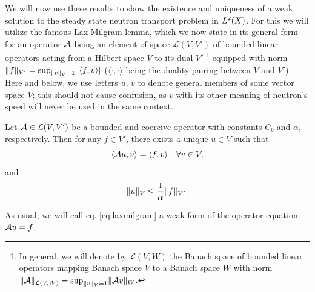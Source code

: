 {We will now use these results to show the existence and uniqueness of a weak solution to the steady state neutron
transport problem in $\Lp[2](X)$. For this we will utilize the famous Lax-Milgram lemma, which we now state in its
general form for an operator $\genop{A}$ being an element of space $\mathcal{L}(V,V')$ of bounded linear operators acting from 
a Hilbert space $V$ to its dual $V'$ \footnote{In general, we will denote by
$\mathcal{L}(V,W)$
 the Banach space of bounded linear operators mapping Banach space $V$ to a Banach space $W$ 
with norm $\norm[\mathcal{L}(V,W)]{\genop{A}} = \sup_{\norm[V]{v}=1} \norm[W]{\genop{A}v}$.} equipped with norm
$\norm[V']{f} = \sup_{\norm[V]{v} = 1} \abs{\langle f,v \rangle}$ ($\langle \cdot,\cdot\rangle$ being the duality 
pairing between $V$ and $V'$). Here and below, we use letters $u$, $v$ to denote general members of some vector space
$V$; this should not cause confusion, as $v$ with its other meaning of neutron's speed will never be used in the same
context.

\begin{lemma}\label{lem:lax-milgram}
	Let $\genop{A}\in\mathcal{L}(V,V')$ be a bounded and coercive operator with constants $C_b$ and $\alpha$, respectively.
	Then for any $f\in V'$, there exists a unique $u\in V$ such that
	\begin{equation}\label{eq:laxmilgram}
		\langle \genop{A}u, v \rangle = \langle f, v \rangle  \quad \forall v\in V,
	\end{equation}
	and
	$$
		\norm[V]{u} \leq \frac{1}{\alpha}\norm[V']{f}.
	$$
\end{lemma}
As usual, we will call eq. \eqref{eq:laxmilgram} a weak form of the operator equation $\genop{A}u = f$.

}
